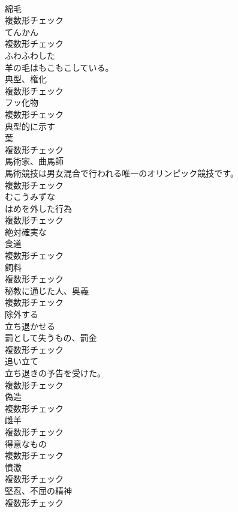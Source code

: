 \documentclass[8pt]{extreport}
\begin{document}
\begin{CJK}{UTF8}{min}
\\	[名詞]	綿毛	
\\	複数形チェック
\\	[名詞]	てんかん	
\\	複数形チェック
\\	[形容詞]	ふわふわした	
\\	羊の毛はもこもこしている。	
\\	[名詞]	典型、権化	
\\	複数形チェック
\\	[名詞]	フッ化物	
\\	複数形チェック
\\	[動詞]	典型的に示す	
\\	[名詞]	葉	
\\	複数形チェック
\\	[名詞]	馬術家、曲馬師	
\\	馬術競技は男女混合で行われる唯一のオリンピック競技です。	
\\	複数形チェック
\\	[形容詞]	むこうみずな	
\\	[名詞]	はめを外した行為	
\\	複数形チェック
\\	[形容詞]	絶対確実な	
\\	[名詞]	食道	
\\	複数形チェック
\\	[名詞]	飼料	
\\	複数形チェック
\\	[名詞]	秘教に通じた人、奥義	
\\	複数形チェック
\\	[動詞]	除外する	
\\	[動詞]	立ち退かせる	
\\	[名詞]	罰として失うもの、罰金	
\\	複数形チェック
\\	[名詞]	追い立て	
\\	立ち退きの予告を受けた。	
\\	複数形チェック
\\	[名詞]	偽造	
\\	複数形チェック
\\	[名詞]	雌羊	
\\	複数形チェック
\\	[名詞]	得意なもの	
\\	複数形チェック
\\	[名詞]	憤激	
\\	複数形チェック
\\	[名詞]	堅忍、不屈の精神	
\\	複数形チェック

\end{CJK}
\end{document}
